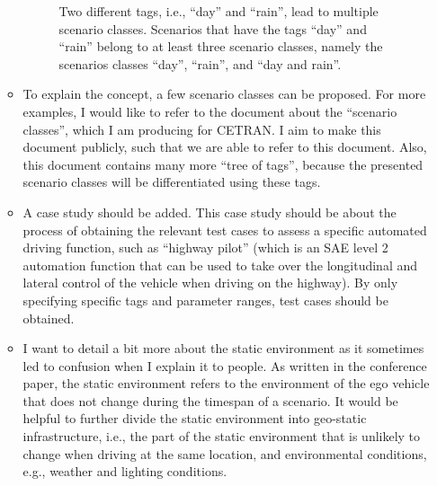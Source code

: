 \documentclass[10pt,final,a4paper,oneside,onecolumn]{article}
\newlength\venncircle\setlength{\venncircle}{10em}
\begin{document}
\begin{itemize}
\begin{itemize}
\begin{figure}
			\caption{Two different tags, i.e., ``day'' and ``rain'', lead to multiple scenario classes. Scenarios that have the tags ``day'' and ``rain'' belong to at least three scenario classes, namely the scenarios classes ``day'', ``rain'', and ``day and rain''.}
			\label{fig:venn diagram scenario class}
		\end{figure}
		\item To explain the concept, a few scenario classes can be proposed. For more examples, I would like to refer to the document about the ``scenario classes'', which I am producing for CETRAN. I aim to make this document publicly, such that we are able to refer to this document. Also, this document contains many more ``tree of tags'', because the presented scenario classes will be differentiated using these tags.
		\item A case study should be added. This case study should be about the process of obtaining the relevant test cases to assess a specific automated driving function, such as ``highway pilot'' (which is an SAE level 2 automation function that can be used to take over the longitudinal and lateral control of the vehicle when driving on the highway). By only specifying specific tags and parameter ranges, test cases should be obtained. 
		\item I want to detail a bit more about the static environment as it sometimes led to confusion when I explain it to people. As written in the conference paper, the static environment refers to the environment of the ego vehicle that does not change during the timespan of a scenario. It would be helpful to further divide the static environment into geo-static infrastructure, i.e., the part of the static environment that is unlikely to change when driving at the same location, and environmental conditions, e.g., weather and lighting conditions.
	\end{itemize}


\end{itemize}
\end{document}
